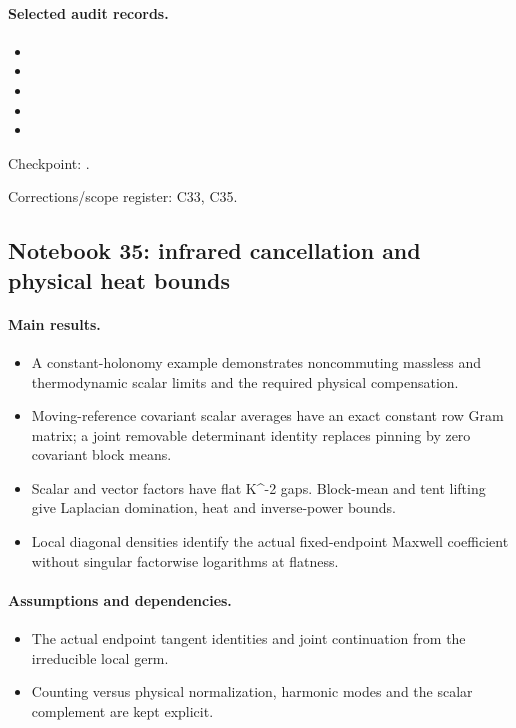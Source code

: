 \documentclass[11pt]{article}
\theoremstyle{remark}
\begin{document}
\paragraph{Selected audit records.}
\begingroup\small
\begin{itemize}
\item {}
\item {}
\item {}
\item {}
\item {}
\end{itemize}
\endgroup

Checkpoint: .\par
Corrections/scope register: C33, C35.\par

\subsection{Notebook 35: infrared cancellation and physical heat bounds}
\label{hnc-35}
\noindent{}\par

\paragraph{Main results.}
\begin{itemize}
\item A constant-holonomy example demonstrates noncommuting massless and thermodynamic scalar limits and the required physical compensation.
\item Moving-reference covariant scalar averages have an exact constant row Gram matrix; a joint removable determinant identity replaces pinning by zero covariant block means.
\item Scalar and vector factors have flat K\textasciicircum{}-2 gaps. Block-mean and tent lifting give Laplacian domination, heat and inverse-power bounds.
\item Local diagonal densities identify the actual fixed-endpoint Maxwell coefficient without singular factorwise logarithms at flatness.
\end{itemize}

\paragraph{Assumptions and dependencies.}
\begin{itemize}
\item The actual endpoint tangent identities and joint continuation from the irreducible local germ.
\item Counting versus physical normalization, harmonic modes and the scalar complement are kept explicit.
\end{itemize}
\end{document}
